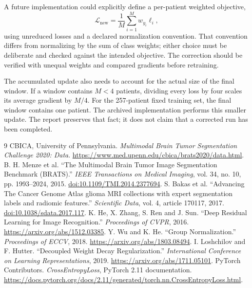 \documentclass[12pt,a4paper,oneside]{report}
\begin{document}
A future implementation could explicitly define a per-patient weighted objective,
\begin{equation}
\mathcal L_{\mathrm{new}}=\frac{1}{M}\sum_{i=1}^{M}w_{y_i}\ell_i,
\end{equation}
using unreduced losses and a declared normalization convention. That convention differs from normalizing by the sum of class weights; either choice must be deliberate and checked against the intended objective. The correction should be verified with unequal weights and compared gradients before retraining.

The accumulated update also needs to account for the actual size of the final window. If a window contains $M<4$ patients, dividing every loss by four scales its average gradient by $M/4$. For the 257-patient fixed training set, the final window contains one patient. The archived implementation performs this smaller update. The report preserves that fact; it does not claim that a corrected run has been completed.

\clearpage
\renewcommand{\bibname}{References}
\begin{thebibliography}{9}
\small
{} CBICA, University of Pennsylvania. \emph{Multimodal Brain Tumor Segmentation Challenge 2020: Data}. \url{https://www.med.upenn.edu/cbica/brats2020/data.html}.
 B. H. Menze et al. ``The Multimodal Brain Tumor Image Segmentation Benchmark (BRATS).'' \emph{IEEE Transactions on Medical Imaging}, vol. 34, no. 10, pp. 1993--2024, 2015. \href{https://doi.org/10.1109/TMI.2014.2377694}{doi:10.1109/TMI.2014.2377694}.
 S. Bakas et al. ``Advancing The Cancer Genome Atlas glioma MRI collections with expert segmentation labels and radiomic features.'' \emph{Scientific Data}, vol. 4, article 170117, 2017. \href{https://doi.org/10.1038/sdata.2017.117}{doi:10.1038/sdata.2017.117}.
 K. He, X. Zhang, S. Ren and J. Sun. ``Deep Residual Learning for Image Recognition.'' \emph{Proceedings of CVPR}, 2016. \url{https://arxiv.org/abs/1512.03385}.
 Y. Wu and K. He. ``Group Normalization.'' \emph{Proceedings of ECCV}, 2018. \url{https://arxiv.org/abs/1803.08494}.
 I. Loshchilov and F. Hutter. ``Decoupled Weight Decay Regularization.'' \emph{International Conference on Learning Representations}, 2019. \url{https://arxiv.org/abs/1711.05101}.
 PyTorch Contributors. \emph{CrossEntropyLoss}, PyTorch 2.11 documentation. \url{https://docs.pytorch.org/docs/2.11/generated/torch.nn.CrossEntropyLoss.html}.
\end{thebibliography}
\end{document}
